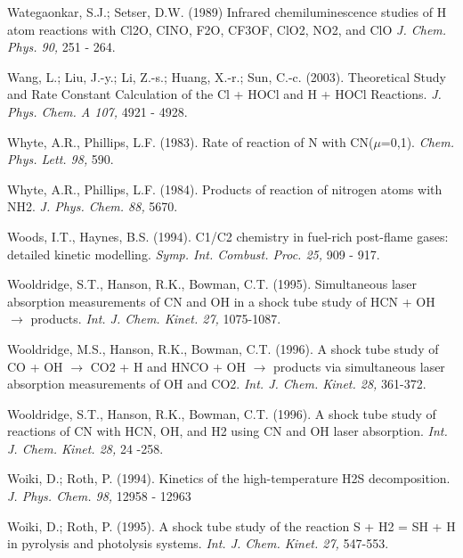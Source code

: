 \documentclass[12pt,landscape]{article}
\newcounter{reaction}
\newcounter{photo}
\begin{document}

Wategaonkar, S.J.; Setser, D.W. (1989)
 Infrared chemiluminescence studies of H atom reactions with Cl2O, CINO, F2O, CF3OF, ClO2, NO2, and ClO
{\em J. Chem. Phys. 90,}  251 - 264.

Wang, L.; Liu, J.-y.; Li, Z.-s.; Huang, X.-r.; Sun, C.-c. (2003).  Theoretical Study and Rate Constant Calculation of the Cl + HOCl and H + HOCl Reactions. {\em J. Phys. Chem. A 107,} 4921 - 4928.  %

Whyte, A.R., Phillips, L.F. (1983).  Rate of reaction of N with CN($\mu$=0,1). {\em Chem. Phys. Lett.  98,} 590.

Whyte, A.R., Phillips, L.F. (1984).  Products of reaction of nitrogen atoms with NH2. {\em J. Phys. Chem.  88,} 5670.

Woods, I.T., Haynes, B.S. (1994). C1/C2 chemistry in fuel-rich post-flame gases: detailed kinetic modelling. {\em Symp. Int. Combust. Proc. 25,} 909 - 917.

Wooldridge, S.T., Hanson, R.K., Bowman, C.T. (1995). Simultaneous laser absorption measurements of CN and OH in a shock tube study of HCN + OH $\rightarrow$ products.  {\em Int. J. Chem. Kinet. 27,} 1075-1087.

Wooldridge, M.S., Hanson, R.K., Bowman, C.T. (1996). A shock tube study of CO + OH $\rightarrow$ CO2 + H and HNCO + OH $\rightarrow$ products via simultaneous laser absorption measurements of OH and CO2.  {\em Int. J. Chem. Kinet. 28,} 361-372.

Wooldridge, S.T., Hanson, R.K., Bowman, C.T. (1996). A shock tube study of reactions of CN with HCN, OH, and H2 using CN and OH laser absorption.   {\em Int. J. Chem. Kinet. 28,} 24 -258.

Woiki, D.; Roth, P. (1994). Kinetics of the high-temperature H2S decomposition.  {\em J. Phys. Chem. 98,} 12958 - 12963

Woiki, D.; Roth, P. (1995). A shock tube study of the reaction S + H2 = SH + H in pyrolysis and photolysis systems. {\em Int. J. Chem. Kinet. 27,}  547-553.
\end{document}
